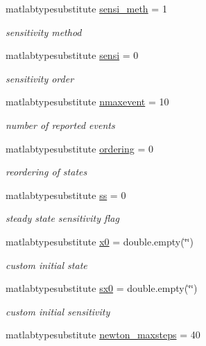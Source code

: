 \begin{DoxyCompactItemize}
matlabtypesubstitute \mbox{\hyperlink{classamioption_ab31e219eb42bc06629c3f247a01b9906}{sensi\+\_\+meth}} = 1
\begin{DoxyCompactList}\small\item\em sensitivity method \end{DoxyCompactList}\item 
matlabtypesubstitute \mbox{\hyperlink{classamioption_a7dd31d33463c5a709251bcef0eccaa36}{sensi}} = 0
\begin{DoxyCompactList}\small\item\em sensitivity order \end{DoxyCompactList}\item 
matlabtypesubstitute \mbox{\hyperlink{classamioption_a85519d27e7231ac625e5b2deee92165a}{nmaxevent}} = 10
\begin{DoxyCompactList}\small\item\em number of reported events \end{DoxyCompactList}\item 
matlabtypesubstitute \mbox{\hyperlink{classamioption_aa5d555210685086c19e5d08afca6685b}{ordering}} = 0
\begin{DoxyCompactList}\small\item\em reordering of states \end{DoxyCompactList}\item 
matlabtypesubstitute \mbox{\hyperlink{classamioption_a8f60c8102d29fcd525162d02eed4566b}{ss}} = 0
\begin{DoxyCompactList}\small\item\em steady state sensitivity flag \end{DoxyCompactList}\item 
matlabtypesubstitute \mbox{\hyperlink{classamioption_aa48da42c617fdb7cf84e9a3f80aa04e8}{x0}} = double.\+empty(\char`\"{}\char`\"{})
\begin{DoxyCompactList}\small\item\em custom initial state \end{DoxyCompactList}\item 
matlabtypesubstitute \mbox{\hyperlink{classamioption_ae40f9a7172d3a41725c151afaec347f7}{sx0}} = double.\+empty(\char`\"{}\char`\"{})
\begin{DoxyCompactList}\small\item\em custom initial sensitivity \end{DoxyCompactList}\item 
matlabtypesubstitute \mbox{\hyperlink{classamioption_a003c445698766726237b11dc6e5120fe}{newton\+\_\+maxsteps}} = 40

\end{DoxyCompactItemize}
